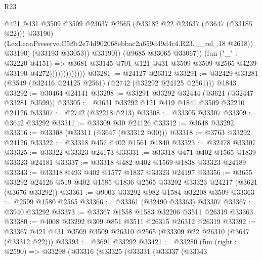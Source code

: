 \begin{lexlean}{R23}
\begin{coremodule}
                                          @421
                                          @431
                                          @3509
                                          @3509
                                          @23637
                                          @2565
                                          (@33182 @22 @23637 (@3647 (@33185 @22)))
                                          @33190)
                                        (LexLeanPreserve.C5f9c2e74d902068ebbac2a659d49d4c4.R23.__rel_18
                                          @2618))
                                      @33190)
                                    (@33193 @33053))
                                  @33190))
                              (@9685 @33065 @33067))
                            (fun ("_" : @32220 @4151) =>
                            @3681
                              @33145
                              @701
                              @121
                              @431
                              @3509
                              @3509
                              @2565
                              @4239
                              @33190
                              @4272)))))))))))))
@33281 := @24127 @26312
@33291 := @32429 @33281 (@3549 (@32416 @24125 @2561) (@2742 (@32292 @24125 @2561))) @1843
@33292 := @30464 @24141
@33298 := @33291 @33292 @32444 (@3621 (@32447 @33281 @3599))
@33305 := @3631 @33292 @121 @419 @1841 @3509 @32210 @24126
@33307 := @2742 (@32218 @213)
@33308 := @33305 @33307
@33309 := @3642 @33292
@33311 := @33309 @30 @24126
@33312 := @3648 @33292
@33316 := @33308 (@33311 (@3647 (@33312 @30)))
@33318 := @3763 @33292 @24126
@33322 := @33318 @457 @402 @1561 @1840
@33323 := @32478 @33307
@33325 := @33322 @33323 @24173
@33331 := @33318 @471 @402 @1565 @1839 @33323 @24181
@33337 := @33318 @482 @402 @1569 @1838 @33323 @24189
@33343 := @33318 @493 @402 @1577 @1837 @33323 @24197
@33356 := @3655
    @33292
    @24126
    @519
    @402
    @1585
    @1836
    @2565
    @33292
    @33323
    @24217
    (@3621 (@3676 @33292))
@33361 := @9003 @33292 @982 @1584 @32208 @3509
@33363 := @2599 @1580 @2565
@33366 := @33361 (@32490 @33363) @33307
@33367 := @3940 @33292
@33373 := @33367 @1558 @1583 @32206 @3511 @26319 @33363
@33380 := @4008 @33292 @309 @851 @3511 @26315 @26312 @26319
@33392 := @33367 @421 @431 @3509 @3509 @26310 @2565 (@33309 @22 @26310 (@3647 (@33312 @22)))
@33393 := @3691 @33292
@33421 := @33280
    (fun (right : @2590) =>
    @33298
      (@33316
        (@33325
          (@33331
            (@33337
              (@33343

\end{coremodule}
\end{lexlean}
